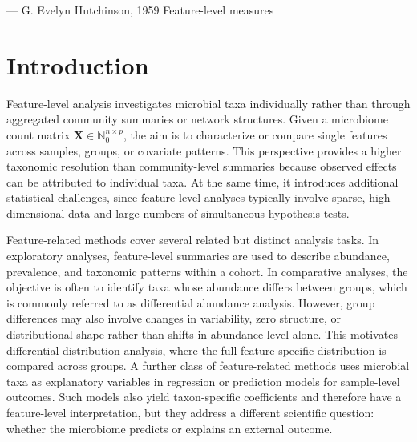 
  {--- G. Evelyn Hutchinson, 1959}
  {Feature-level measures}
\nocite{hutchinson1959homage}
\chaptercontents


\section{Introduction}
\label{sec:feature:intro}

Feature-level analysis investigates microbial taxa individually rather than through aggregated community summaries or network structures. Given a microbiome count matrix $\mathbf{X} \in \mathbb{N}_0^{n \times p}$, the aim is to characterize or compare single features across samples, groups, or covariate patterns. This perspective provides a higher taxonomic resolution than community-level summaries because observed effects can be attributed to individual taxa. At the same time, it introduces additional statistical challenges, since feature-level analyses typically involve sparse, high-dimensional data and large numbers of simultaneous hypothesis tests.

Feature-related methods cover several related but distinct analysis tasks. In exploratory analyses, feature-level summaries are used to describe abundance, prevalence, and taxonomic patterns within a cohort. In comparative analyses, the objective is often to identify taxa whose abundance differs between groups, which is commonly referred to as differential abundance analysis. However, group differences may also involve changes in variability, zero structure, or distributional shape rather than shifts in abundance level alone. This motivates differential distribution analysis, where the full feature-specific distribution is compared across groups. A further class of feature-related methods uses microbial taxa as explanatory variables in regression or prediction models for sample-level outcomes. Such models also yield taxon-specific coefficients and therefore have a feature-level interpretation, but they address a different scientific question: whether the microbiome predicts or explains an external outcome.

